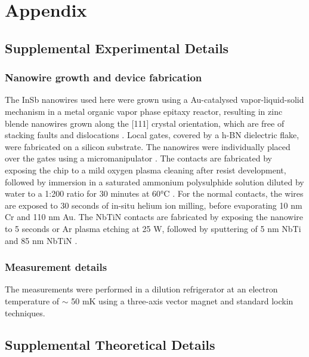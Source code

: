 \section{Appendix}

\subsection{Supplemental Experimental Details}
\subsubsection{Nanowire growth and device fabrication}
The \mbox{InSb} nanowires used here were grown using a Au-catalysed vapor-liquid-solid mechanism in a metal organic vapor phase epitaxy reactor, resulting in zinc blende nanowires grown \mbox{along} the [111] crystal orientation, which are free of stacking \mbox{faults} and dislocations \cite{Car2014}.
Local gates, covered by a h-BN dielectric flake, were fabricated on a silicon substrate.
The nanowires were individually placed over the gates using a micromanipulator \cite{Floehr2011}.
The contacts are fabricated by exposing the chip to a mild oxygen plasma cleaning after resist development, followed by immersion in a saturated ammonium polysulphide solution diluted by water to a 1:200 ratio for 30 minutes at \ang{60}C \cite{Suyatin2007}.
For the normal contacts, the wires are exposed to 30 seconds of in-situ helium ion milling, before evaporating 10 nm Cr and 110 nm Au.
The NbTiN contacts are fabricated by exposing the nanowire to 5 seconds or Ar plasma etching at 25 W, followed by sputtering of 5 nm NbTi and 85 nm NbTiN \cite{Guel2017,Zhang2017}.

\subsubsection{Measurement details}
The measurements were performed in a dilution refrigerator at an electron temperature of $\sim$ 50 mK  using a three-axis vector magnet and standard lockin techniques.

\subsection{Supplemental Theoretical Details}

